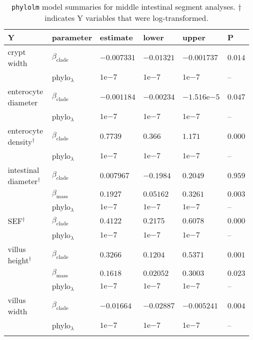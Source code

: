 \documentclass[12pt,]{article}
\begin{document}
\begin{table}[t]
\caption{\label{tab:results-mid-summs}\texttt{phylolm} model summaries for middle intestinal segment analyses. $\dagger$ indicates Y variables that were log-transformed.}
\centering
\begin{tabular}{llllll}
\toprule
Y & parameter & estimate & lower & upper & P\\
\midrule
crypt width & $\beta_{\text{clade}}$ & $-0.007331$ & $-0.01321$ & $-0.001737$ & $0.014$\\
 & phylo$_{\lambda}$ & $1 \mathrm{e}{-7}$ & $1 \mathrm{e}{-7}$ & $1 \mathrm{e}{-7}$ & –\\
\addlinespace
enterocyte diameter & $\beta_{\text{clade}}$ & $-0.001184$ & $-0.00234$ & $-1.516 \mathrm{e}{-5}$ & $0.047$\\
 & phylo$_{\lambda}$ & $1 \mathrm{e}{-7}$ & $1 \mathrm{e}{-7}$ & $1 \mathrm{e}{-7}$ & –\\
\addlinespace
enterocyte density$^{\dagger}$ & $\beta_{\text{clade}}$ & $0.7739$ & $0.366$ & $1.171$ & $0.000$\\
 & phylo$_{\lambda}$ & $1 \mathrm{e}{-7}$ & $1 \mathrm{e}{-7}$ & $1 \mathrm{e}{-7}$ & –\\
\addlinespace
intestinal diameter$^{\dagger}$ & $\beta_{\text{clade}}$ & $0.007967$ & $-0.1984$ & $0.2049$ & $0.959$\\
 & $\beta_{\text{mass}}$ & $0.1927$ & $0.05162$ & $0.3261$ & $0.003$\\
 & phylo$_{\lambda}$ & $1 \mathrm{e}{-7}$ & $1 \mathrm{e}{-7}$ & $1 \mathrm{e}{-7}$ & –\\
\addlinespace
SEF$^{\dagger}$ & $\beta_{\text{clade}}$ & $0.4122$ & $0.2175$ & $0.6078$ & $0.000$\\
 & phylo$_{\lambda}$ & $1 \mathrm{e}{-7}$ & $1 \mathrm{e}{-7}$ & $1 \mathrm{e}{-7}$ & –\\
\addlinespace
villus height$^{\dagger}$ & $\beta_{\text{clade}}$ & $0.3266$ & $0.1204$ & $0.5371$ & $0.001$\\
 & $\beta_{\text{mass}}$ & $0.1618$ & $0.02052$ & $0.3003$ & $0.023$\\
 & phylo$_{\lambda}$ & $1 \mathrm{e}{-7}$ & $1 \mathrm{e}{-7}$ & $1 \mathrm{e}{-7}$ & –\\
\addlinespace
villus width & $\beta_{\text{clade}}$ & $-0.01664$ & $-0.02887$ & $-0.005241$ & $0.004$\\
 & phylo$_{\lambda}$ & $1 \mathrm{e}{-7}$ & $1 \mathrm{e}{-7}$ & $1 \mathrm{e}{-7}$ & –\\
\addlinespace
\bottomrule
\end{tabular}
\end{table}
\end{document}
